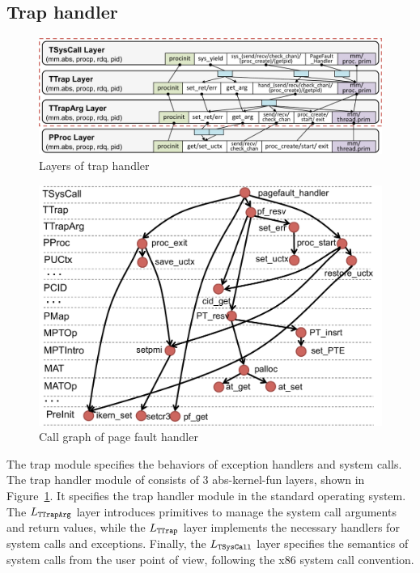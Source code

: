 \subsection{Trap handler}
\label{sec:base:trap}

\begin{figure}[t]\centering
\includegraphics[scale=0.6]{figs/trap_layer_base}	
\caption{Layers of trap handler}
\label{fig:base:trap:layers}
\hrulefill
\end{figure}

{
\begin{figure}\centering
\includegraphics[scale=0.5]{figs/pagefault}	
\caption{Call graph of page fault handler}
\label{fig:base:trap:pagefault}
\hrulefill
\end{figure}
}

The trap module specifies the behaviors of exception handlers and
\mCTOSbase{} system calls.
The trap handler module of \mCTOSbase{} consists of 3 abs-kernel-fun
layers, shown in Figure~\ref{fig:base:trap:layers}.  It specifies the
trap handler module in the standard operating system.  The
$L_{\texttt{TTrapArg}}$ layer introduces primitives to manage the system call
arguments and return values, while the $L_{\texttt{TTrap}}$ layer implements
the necessary handlers for system calls and exceptions.  Finally, the
$L_{\texttt{TSysCall}}$ layer specifies the semantics of system calls from the
user point of view, following the x86 system call convention.

